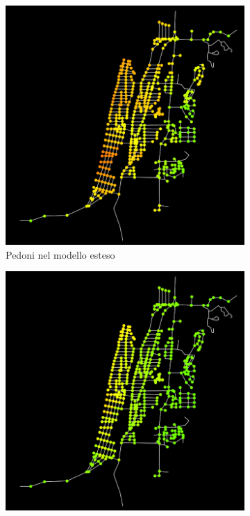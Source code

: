 \begin{figure}[ht]
\begin{subfigure}{0.475\textwidth}
        \includegraphics[width=\textwidth]{images/analisi/comparison-ev-times-map-new-ped.png}
        \caption{Pedoni nel modello esteso}
        \label{fig:2d-evtimes-new-ped}
    \end{subfigure}
    \hfill
    \begin{subfigure}{0.475\textwidth}
        \centering
        \includegraphics[width=\textwidth]{images/analisi/comparison-ev-times-map-base-car.png}

\end{subfigure}
\end{figure}
